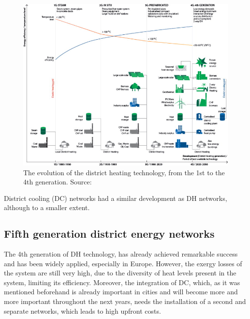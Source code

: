 \documentclass{article}
\begin{document}
\begin{figure}[h!]
\centering
\includegraphics[width=1\textwidth]{4GDH.jpg}
\caption{The evolution of the district heating technology, from the 1st to the 4th generation. Source: \cite{lund4thGenerationDistrict2014}}
\label{fig:4GDH}
\end{figure}

District cooling (DC) networks had a similar development as DH networks, although to a smaller extent. 

\subsection{Fifth generation district energy networks}\label{ss:5gden}
The 4th generation of DH technology, has already achieved remarkable success and has been widely applied, especially in Europe. However, the exergy losses of the system are still very high, due to the diversity of heat levels present in the system, limiting its efficiency. Moreover, the integration of DC, which, as it was mentioned beforehand is already important in cities and will become more and more important throughout the next years, needs the installation of a second and separate networks, which leads to high upfront costs. 
\end{document}
